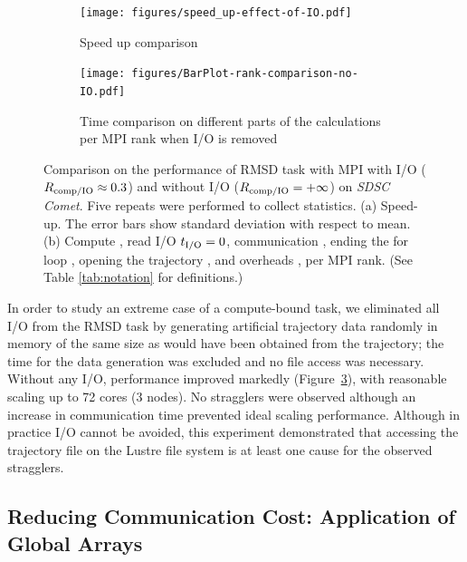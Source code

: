  \begin{figure}[!htb]
   \centering
   \begin{subfigure}{.35\textwidth}
     \texttt{[image: figures/speed\_up-effect-of-IO.pdf]}
     \caption{Speed up comparison}
     \label{fig:MPIspeedup-no-IO}
   \end{subfigure}
   \hfill
   \begin{subfigure}{.45\textwidth}
     \texttt{[image: figures/BarPlot-rank-comparison-no-IO.pdf]}
     \captionsetup{format=hang}
     \caption{Time comparison on different parts of the calculations per MPI rank when I/O is removed}
     \label{fig:MPIranks-no-IO}
   \end{subfigure}
   \caption{Comparison on the performance of RMSD task with MPI with I/O ($R_{\text{comp/IO}} \approx 0.3$) and without I/O ($R_{\text{comp/IO}} = +\infty$) on \emph{SDSC Comet}.
     Five repeats were performed to collect statistics.
     (a) Speed-up. The error bars show standard deviation with respect to mean.
     (b) Compute \tcomp, read I/O ${t}_{\text{I/O}}=0$, communication \tcomm, ending the for loop ,
     opening the trajectory , and overheads ,  per MPI rank.
     (See Table \ref{tab:notation} for definitions.)}
   \label{fig:MPIwithoutIO}
\end{figure}

In order to study an extreme case of a compute-bound task, we eliminated all I/O from the RMSD task by generating artificial trajectory data randomly in memory of the same size as would have been obtained from the trajectory; the time for the data generation was excluded and no file access was necessary. 
Without any I/O, performance improved markedly (Figure~\ref{fig:MPIwithoutIO}), with reasonable scaling up to 72 cores (3 nodes).
No stragglers were observed although an increase in communication time prevented ideal scaling performance.
Although in practice I/O cannot be avoided, this experiment demonstrated that accessing the trajectory file on the Lustre file system is at least one cause for the observed stragglers.

\subsection{Reducing Communication Cost: Application of Global Arrays}
\label{Global-Array}

